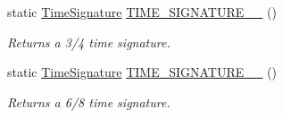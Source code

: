 \begin{DoxyCompactItemize}
static \hyperlink{group___music_structs_struct_music_1_1_time_signature}{Time\+Signature} \hyperlink{group___music_stat_func_ga0392e239cbd45a23e5f76f88d0b4c152}{T\+I\+M\+E\+\_\+\+S\+I\+G\+N\+A\+T\+U\+R\+E\+\_\+\_} ()
\begin{DoxyCompactList}\small\item\em Returns a 3/4 time signature. \end{DoxyCompactList}\item 
static \hyperlink{group___music_structs_struct_music_1_1_time_signature}{Time\+Signature} \hyperlink{group___music_stat_func_gabfda54cf40e32a4299de5a2fde753347}{T\+I\+M\+E\+\_\+\+S\+I\+G\+N\+A\+T\+U\+R\+E\+\_\+\_} ()
\begin{DoxyCompactList}\small\item\em Returns a 6/8 time signature. \end{DoxyCompactList}\end{DoxyCompactItemize}
